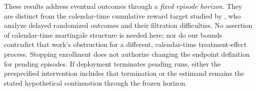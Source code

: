 These results address eventual outcomes through a \emph{fixed episode
horizon}. They are distinct from the calendar-time cumulative reward
target studied by \citet{lindon2026delayed}, who analyze delayed
randomized outcomes and their filtration difficulties. No assertion of
calendar-time martingale structure is needed here; nor do our bounds
contradict that work's obstruction for a different, calendar-time
treatment-effect process. Stopping enrollment does not authorize
changing the endpoint definition for pending episodes. If deployment
terminates pending runs, either the prespecified intervention includes
that termination or the estimand remains the stated hypothetical
continuation through the frozen horizon.
